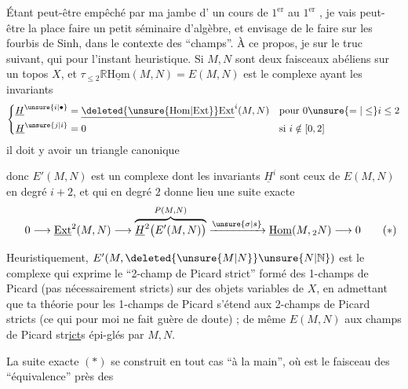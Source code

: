 Étant peut-être empêché par ma jambe d' un cours de $1^{\mathrm{er}}$  au $1^{\mathrm{er}}$ , je vais peut-être  la place faire un petit séminaire d'algèbre, et envisage de le faire sur les fourbis de  Sinh,   dans le contexte des ``champs''. À ce propos, je  sur le truc suivant,
qui pour l'instant  heuristique. Si $M,N$ sont deux faisceaux abéliens sur un topos $X$, et $\tau_{\leq 2}\mathbb{R}\underline{\mathrm{Hom}}(M,N)=E(M,N)$ est le complexe ayant les invariants
\[
\left\{\begin{aligned}
\underline{H}^{\unsure{i|\bullet}}&=\underline{\deleted{\unsure{\mathrm{Hom}|\mathrm{Ext}}}\mathrm{Ext}}^{i}(M,N) &&\text{pour }0\unsure{=|\leq}i\leq 2\\
\underline{H}^{\unsure{j|i}}&=0 &&\text{si }i\notin[0,2]
\end{aligned}\right.
\]
il doit y avoir un triangle  canonique


donc $E'(M,N)$ est un complexe dont les invariants $\underline{H}^{i}$ sont ceux de $E(M,N)$ en degré $i+2$, et qui en degré $2$ donne lieu  une suite exacte
\[
0\longrightarrow\underline{\mathrm{Ext}}^{2}(M,N)\longrightarrow
\overbrace{\underline{H}^{2}\bigl(E'(M,N)\bigr)}^{P(M,N)}
\xrightarrow{\unsure{\sigma|s}}\underline{\mathrm{Hom}}(M,{}_{2}N)\longrightarrow 0
\tag*{\makebox[0pt][r]{\makebox[\displaywidth][l]{$(*)$}}}
\]

Heuristiquement, $E'(M,\deleted{\unsure{M|N}}\unsure{N|\mathbb{N}})$ est le complexe qui exprime le ``2-champ de Picard strict'' formé des 1-champs de Picard (pas nécessairement stricts)  sur des objets variables de $X$, en admettant que ta théorie pour les 1-champs de Picard  s'étend aux 2-champs de Picard stricts (ce qui pour moi ne fait guère de doute) ; de même $E(M,N)$  aux champs de Picard str\uline{ict}s épi-glés par $M,N$.

La suite exacte $(*)$ se construit en tout cas  ``à la main'', où    est le faisceau des    ``équivalence'' près des

